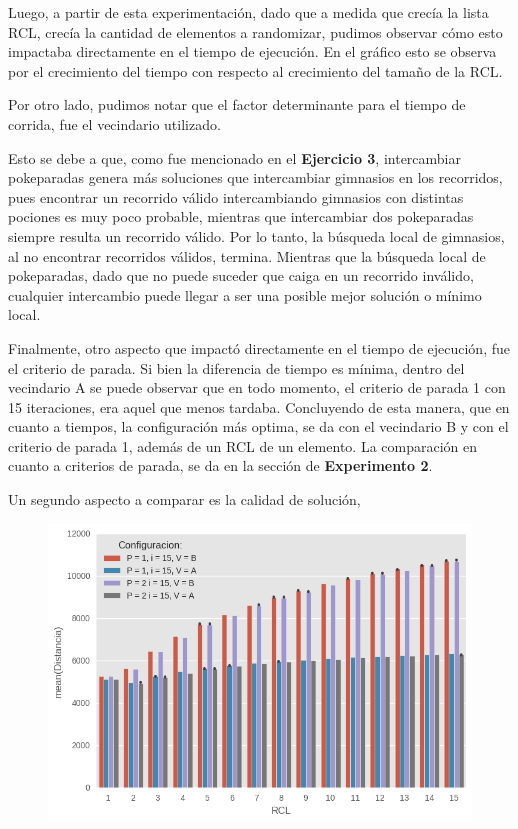   Luego, a partir de esta experimentación, dado que a medida que crecía la lista RCL, crecía la cantidad de elementos a randomizar, pudimos observar cómo esto impactaba directamente en el tiempo de ejecución. En el gráfico esto se observa por el crecimiento del tiempo con respecto al crecimiento del tamaño de la RCL. \par Por otro lado, pudimos notar que el factor determinante para el tiempo de corrida, fue el vecindario utilizado. 
  \par Esto se debe a que, como fue mencionado en el \textbf{Ejercicio 3}, intercambiar pokeparadas genera más soluciones que intercambiar gimnasios en los recorridos, pues encontrar un recorrido válido intercambiando gimnasios con distintas pociones es muy poco probable, mientras que intercambiar dos pokeparadas siempre resulta un recorrido válido. Por lo tanto, la búsqueda local de gimnasios, al no encontrar recorridos válidos, termina. Mientras que la búsqueda local de pokeparadas, dado que no puede suceder que caiga en un recorrido inválido, cualquier intercambio puede llegar a ser una posible mejor solución o mínimo local. 
  \par Finalmente, otro aspecto que impactó directamente en el tiempo de ejecución, fue el criterio de parada. Si bien la diferencia de tiempo es mínima, dentro del vecindario A se puede observar que en todo momento, el criterio de parada 1 con 15 iteraciones, era aquel que menos tardaba. Concluyendo de esta manera, que en cuanto a tiempos, la configuración más optima, se da con el vecindario B y con el criterio de parada 1, además de un RCL de un elemento. La comparación en cuanto a criterios de parada, se da en la sección de \textbf{Experimento 2}.

  \par Un segundo aspecto a comparar es la calidad de solución,

\begin{figure}[H]
    \begin{center}
      \includegraphics[width=0.7\columnwidth]{imagenes/Ej4/ej4_exp1_Distancia.png}
    \end{center}
\end{figure}


